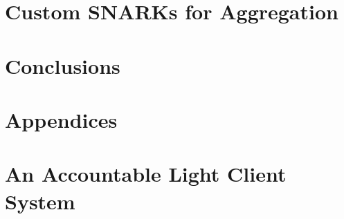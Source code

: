 \documentclass[llncs, nonacm=true]{acmart}
\begin{document}
\section{Custom SNARKs for  Aggregation } \label{sec_apk_proofs}



\section{Conclusions}\label{conclusions}


%



\onecolumn
\appendix
\section*{Appendices}










\section{An Accountable Light Client System} \label{sec_light_client_model}




%

\end{document}
